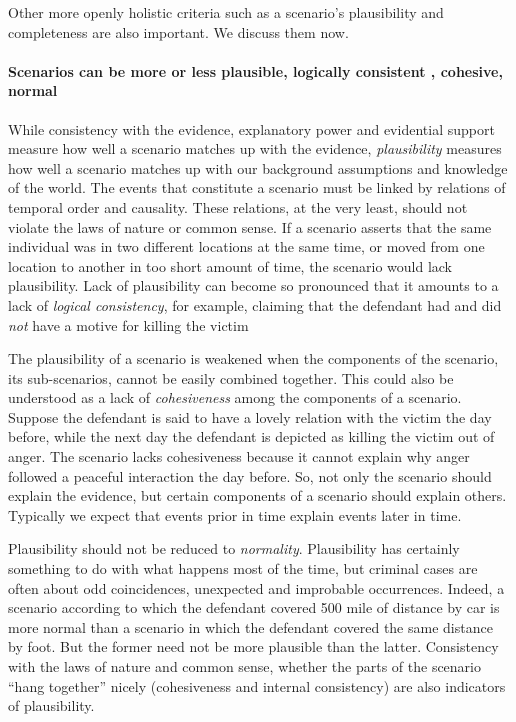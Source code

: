 \documentclass[10pt]{article}
\begin{document}
 
Other more openly holistic criteria such as a scenario's plausibility and completeness are also important. 
 We discuss them now.
  
\paragraph{Scenarios can be more or less plausible, logically consistent , cohesive, normal}

While consistency with the evidence, explanatory power and evidential support measure how well a 
scenario matches up with the evidence, \textit{plausibility} measures how well a scenario matches up with 
our background assumptions and knowledge of the world. The events that constitute a scenario must be linked 
by relations of temporal order and causality. These relations, at the very least, should not violate the laws of nature 
or common sense. If a scenario asserts that the same individual was in two different locations 
at the same time, or moved from one location to another in too short amount of time, the scenario would lack plausibility.  
Lack of plausibility can become so pronounced that it amounts to a lack of \textit{logical consistency}, for example, claiming that 
 the defendant had and did \textit{not} have a motive for killing the victim

The plausibility of a scenario is weakened when the components of the scenario, its
sub-scenarios, cannot be easily combined together. This could also be understood as 
a lack of \textit{cohesiveness} among the components of a scenario. Suppose the defendant is said to have a lovely relation with 
the victim the day before, while the next day the defendant is depicted as killing the victim out of anger.
The scenario lacks cohesiveness because it cannot explain why anger followed a peaceful 
interaction the day before. So, not only the scenario should explain the evidence, but certain
 components of a scenario should explain others. Typically we expect that events prior in time 
 explain events later in time. 
 
 Plausibility should not be reduced to \textit{normality}. Plausibility has certainly something to do with 
what happens most of the time, but criminal cases are often about odd coincidences, 
unexpected and improbable occurrences.  Indeed, a scenario according to which the defendant covered 500 mile of distance by car is more normal than a scenario in which the 
defendant covered the same distance by foot. But the former need not be more plausible than the latter. 
Consistency with the laws of nature and common sense, whether the parts 
of the scenario ``hang together'' nicely (cohesiveness and internal consistency) 
are also indicators of plausibility. 
\end{document}
